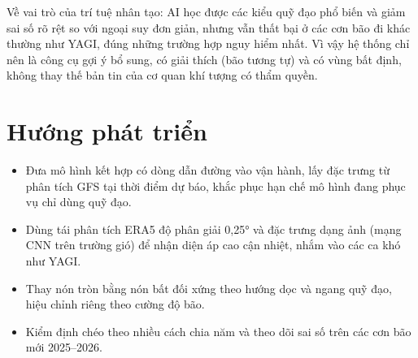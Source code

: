 Về vai trò của trí tuệ nhân tạo: AI học được các kiểu quỹ đạo phổ biến và giảm
sai số rõ rệt so với ngoại suy đơn giản, nhưng vẫn thất bại ở các cơn bão đi
khác thường như YAGI, đúng những trường hợp nguy hiểm nhất. Vì vậy hệ thống chỉ
nên là công cụ gợi ý bổ sung, có giải thích (bão tương tự) và có vùng bất định,
không thay thế bản tin của cơ quan khí tượng có thẩm quyền.

\section{Hướng phát triển}

\begin{itemize}[leftmargin=1.6em, itemsep=2pt]
  \item Đưa mô hình kết hợp có dòng dẫn đường vào vận hành, lấy đặc trưng từ
        phân tích GFS tại thời điểm dự báo, khắc phục hạn chế mô hình đang phục
        vụ chỉ dùng quỹ đạo.
  \item Dùng tái phân tích ERA5 độ phân giải 0,25° và đặc trưng dạng ảnh (mạng
        CNN trên trường gió) để nhận diện áp cao cận nhiệt, nhắm vào các ca khó
        như YAGI.
  \item Thay nón tròn bằng nón bất đối xứng theo hướng dọc và ngang quỹ đạo,
        hiệu chỉnh riêng theo cường độ bão.
  \item Kiểm định chéo theo nhiều cách chia năm và theo dõi sai số trên các cơn
        bão mới 2025--2026.
\end{itemize}
